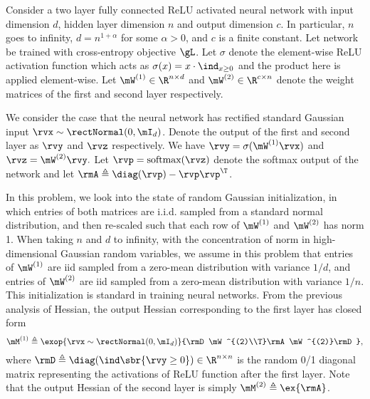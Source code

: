 Consider a two layer fully connected ReLU activated neural network with input dimension $d$, hidden layer dimension $n$ and output dimension $c$. In particular, $n$ goes to infinity, $d=n^{1+\alpha}$ for some $\alpha>0$, and $c$ is a finite constant. Let network be trained with cross-entropy objective $\gL$. Let $\sigma$ denote the element-wise ReLU activation function which acts as $\sigma(x) = x\cdot\ind_{x\geq 0}$ and the product here is applied element-wise.
Let $\mW^{(1)}\in\R^{n\times d}$ and $\mW^{(2)}\in\R^{c\times n}$ denote the weight matrices of the first and second layer respectively. 

We consider the case that the neural network has rectified standard Gaussian input $\rvx\sim \rectNormal(0, \mI_d)$. 
Denote the output of the first and second layer as $\rvy$ and $\rvz$ respectively. We have $\rvy = \sigma(\mW^{(1)}\rvx)$ and $\rvz = \mW^{(2)}\rvy.$ Let $\rvp=\mbox{softmax}(\rvz)$ denote the softmax output of the network and let $\rmA\triangleq\diag(\rvp)-\rvp\rvp^\T$.

In this problem, we look into the state of random Gaussian initialization, in which entries of both matrices are i.i.d. sampled from a standard normal distribution, and then re-scaled such that each row of $\mW^{(1)}$ and $\mW^{(2)}$ has norm 1. When taking $n$ and $d$ to infinity, with the concentration of norm in high-dimensional Gaussian random variables, we assume in this problem that entries of $\mW^{(1)}$ are iid sampled from a zero-mean distribution with variance $1/d$, and entries of $\mW^{(2)}$ are iid sampled from a zero-mean distribution with variance $1/n$. This initialization is standard in training neural networks. From the previous analysis of Hessian, the output Hessian corresponding to the first layer has closed form
\begin{equation}
    \mM^{(1)} \triangleq \exop{\rvx\sim \rectNormal(0, \mI_d)}{\rmD\mW^{(2)\\T}\rmA\mW^{(2)}\rmD},
\end{equation}
where $\rmD\triangleq\diag(\ind\sbr{\rvy\geq 0})\in\R^{n\times n}$ is the random 0/1 diagonal matrix representing the activations of ReLU function after the first layer. Note that the output Hessian of the second layer is simply $\mM^{(2)}\triangleq\ex{\rmA}$.

